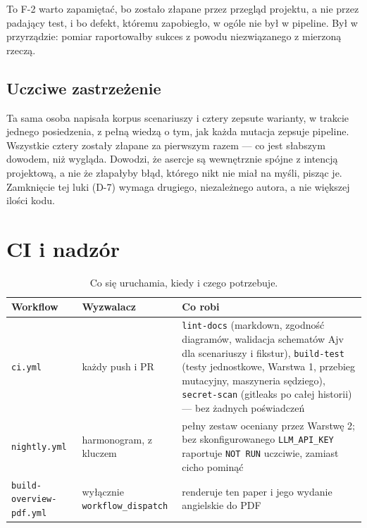 \documentclass[11pt,a4paper]{article}
\begin{document}
To F-2 warto zapamiętać, bo zostało złapane przez przegląd projektu, a nie
przez padający test, i bo defekt, któremu zapobiegło, w ogóle nie był w
pipeline. Był w przyrządzie: pomiar raportowałby sukces z powodu niezwiązanego
z mierzoną rzeczą.

\subsection{Uczciwe zastrzeżenie}

Ta sama osoba napisała korpus scenariuszy i cztery zepsute warianty, w trakcie
jednego posiedzenia, z pełną wiedzą o tym, jak każda mutacja zepsuje pipeline.
Wszystkie cztery zostały złapane za pierwszym razem --- co jest słabszym
dowodem, niż wygląda. Dowodzi, że asercje są wewnętrznie spójne z intencją
projektową, a nie że złapałyby błąd, którego nikt nie miał na myśli, pisząc
je. Zamknięcie tej luki (D-7) wymaga drugiego, niezależnego autora, a nie
większej ilości kodu.

\section{CI i nadzór}

\begin{table}[htbp]
\centering
\caption{Co się uruchamia, kiedy i czego potrzebuje.}
\begin{tabularx}{\linewidth}{@{}llX@{}}
\toprule
\textbf{Workflow} & \textbf{Wyzwalacz} & \textbf{Co robi} \\
\midrule
\texttt{ci.yml} & każdy push i PR &
\texttt{lint-docs} (markdown, zgodność diagramów, walidacja schematów Ajv dla
scenariuszy i fikstur), \texttt{build-test} (testy jednostkowe, Warstwa 1,
przebieg mutacyjny, maszyneria sędziego), \texttt{secret-scan} (gitleaks po
całej historii) --- bez żadnych poświadczeń \\
\addlinespace
\texttt{nightly.yml} & harmonogram, z kluczem &
pełny zestaw oceniany przez Warstwę 2; bez skonfigurowanego
\texttt{LLM\_API\_KEY} raportuje \texttt{NOT RUN} uczciwie, zamiast cicho
pominąć \\
\addlinespace
\texttt{build-overview-pdf.yml} & wyłącznie \texttt{workflow\_dispatch} &
renderuje ten paper i jego wydanie angielskie do PDF \\
\bottomrule
\end{tabularx}
\end{table}
\end{document}
